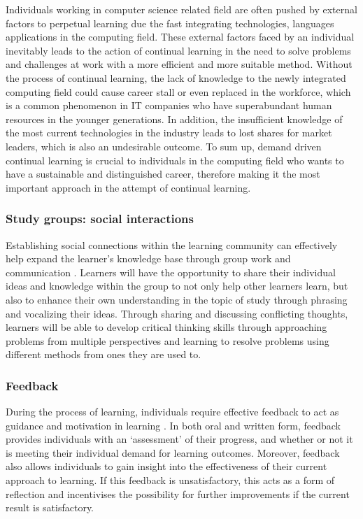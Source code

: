 \documentclass[a4paper, 11pt]{report}
\begin{document}
Individuals working in computer science related field are often pushed by external factors to perpetual learning due the fast integrating technologies, languages applications in the computing field. These external factors faced by an individual inevitably leads to the action of continual learning in the need to solve problems and challenges at work with a more efficient and more suitable method. Without the process of continual learning, the lack of knowledge to the newly integrated computing field could cause career stall or even replaced in the workforce, which is a common phenomenon in IT companies who have superabundant human resources in the younger generations. In addition, the insufficient knowledge of the most current technologies in the industry leads to lost shares for market leaders, which is also an undesirable outcome. To sum up, demand driven continual learning is crucial to individuals in the computing field who wants to have a sustainable and distinguished career, therefore making it the most important approach in the attempt of continual learning. 

\subsubsection{Study groups: social interactions}
Establishing social connections within the learning community can effectively help expand the learner’s knowledge base through group work and communication \cite{laal2012benefits}. Learners will have the opportunity to share their individual ideas and knowledge within the group to not only help other learners learn, but also to enhance their own understanding in the topic of study through phrasing and vocalizing their ideas. Through sharing and discussing conflicting thoughts, learners will be able to develop critical thinking  skills through approaching problems from multiple perspectives and learning to resolve problems using different methods from ones they are used to. 


\subsubsection{Feedback}
During the process of learning, individuals require effective feedback to act as guidance and motivation in learning \cite{vollmeyer2005surprising}. In both oral and written form, feedback provides individuals with an ‘assessment’ of their progress, and whether or not it is meeting their individual demand for learning outcomes. Moreover, feedback also allows individuals to gain insight into the effectiveness of their current approach to learning. If this feedback is unsatisfactory, this acts as a form of reflection and incentivises the possibility for further improvements if the current result is satisfactory. 
\end{document}
